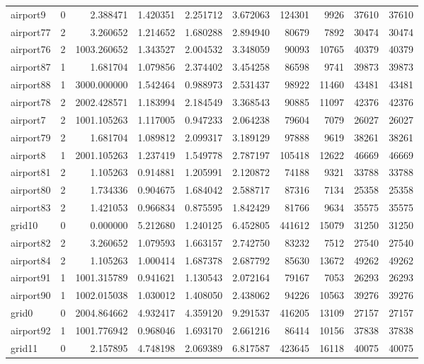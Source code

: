 \begin{longtable}{|l|r|r|r|r|r|r|r|r|r|}
airport9 & 0 & 2.388471 & 1.420351 & 2.251712 & 3.672063 & 124301 & 9926 & 37610 & 37610 \\
airport77 & 2 & 3.260652 & 1.214652 & 1.680288 & 2.894940 & 80679 & 7892 & 30474 & 30474 \\
airport76 & 2 & 1003.260652 & 1.343527 & 2.004532 & 3.348059 & 90093 & 10765 & 40379 & 40379 \\
airport87 & 1 & 1.681704 & 1.079856 & 2.374402 & 3.454258 & 86598 & 9741 & 39873 & 39873 \\
airport88 & 1 & 3000.000000 & 1.542464 & 0.988973 & 2.531437 & 98922 & 11460 & 43481 & 43481 \\
airport78 & 2 & 2002.428571 & 1.183994 & 2.184549 & 3.368543 & 90885 & 11097 & 42376 & 42376 \\
airport7 & 2 & 1001.105263 & 1.117005 & 0.947233 & 2.064238 & 79604 & 7079 & 26027 & 26027 \\
airport79 & 2 & 1.681704 & 1.089812 & 2.099317 & 3.189129 & 97888 & 9619 & 38261 & 38261 \\
airport8 & 1 & 2001.105263 & 1.237419 & 1.549778 & 2.787197 & 105418 & 12622 & 46669 & 46669 \\
airport81 & 2 & 1.105263 & 0.914881 & 1.205991 & 2.120872 & 74188 & 9321 & 33788 & 33788 \\
airport80 & 2 & 1.734336 & 0.904675 & 1.684042 & 2.588717 & 87316 & 7134 & 25358 & 25358 \\
airport83 & 2 & 1.421053 & 0.966834 & 0.875595 & 1.842429 & 81766 & 9634 & 35575 & 35575 \\
grid10 & 0 & 0.000000 & 5.212680 & 1.240125 & 6.452805 & 441612 & 15079 & 31250 & 31250 \\
airport82 & 2 & 3.260652 & 1.079593 & 1.663157 & 2.742750 & 83232 & 7512 & 27540 & 27540 \\
airport84 & 2 & 1.105263 & 1.000414 & 1.687378 & 2.687792 & 85630 & 13672 & 49262 & 49262 \\
airport91 & 1 & 1001.315789 & 0.941621 & 1.130543 & 2.072164 & 79167 & 7053 & 26293 & 26293 \\
airport90 & 1 & 1002.015038 & 1.030012 & 1.408050 & 2.438062 & 94226 & 10563 & 39276 & 39276 \\
grid0 & 0 & 2004.864662 & 4.932417 & 4.359120 & 9.291537 & 416205 & 13109 & 27157 & 27157 \\
airport92 & 1 & 1001.776942 & 0.968046 & 1.693170 & 2.661216 & 86414 & 10156 & 37838 & 37838 \\
grid11 & 0 & 2.157895 & 4.748198 & 2.069389 & 6.817587 & 423645 & 16118 & 40075 & 40075 \\

\end{longtable}

